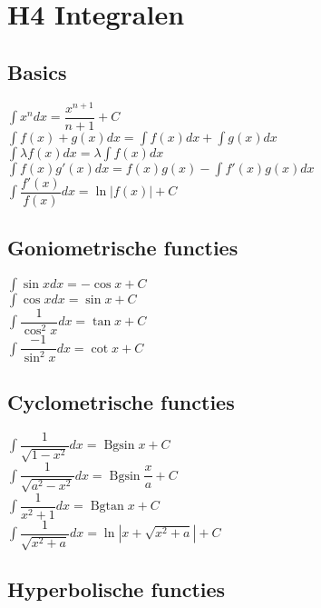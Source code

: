 \section{H4 Integralen}

\subsection{Basics}

$\displaystyle\int x^n dx = \dfrac{x^{n+1}}{n+1}+C$\\
$\displaystyle\int f(x)+g(x)dx = \displaystyle\int f(x)dx + \displaystyle\int g(x)dx$\\
$\displaystyle\int \lambda f(x)dx = \lambda \displaystyle\int f(x)dx$\\
$\displaystyle\int f(x)g'(x)dx = f(x)g(x)-\displaystyle\int f'(x)g(x)dx$\\
$\displaystyle\int \dfrac{f'(x)}{f(x)}dx = \ln |f(x)| + C$\\

\subsection{Goniometrische functies}

$\displaystyle\int \sin x dx = -\cos x + C$\\
$\displaystyle\int \cos x dx = \sin x + C$\\
$\displaystyle\int \dfrac{1}{\cos^2 x}dx = \tan x + C$\\
$\displaystyle\int \dfrac{-1}{\sin^2 x}dx = \cot x + C$\\

\subsection{Cyclometrische functies}

$\displaystyle\int \dfrac{1}{\sqrt{1-x^2}}dx = \operatorname{Bgsin} x + C$\\
$\displaystyle\int \dfrac{1}{\sqrt{a^2-x^2}}dx = \operatorname{Bgsin} \dfrac{x}{a} + C$\\
$\displaystyle\int \dfrac{1}{x^2+1}dx = \operatorname{Bgtan} x + C$\\
$\displaystyle\int \dfrac{1}{\sqrt{x^2+a}}dx = \ln |x+\sqrt{x^2+a}| + C$\\

\subsection{Hyperbolische functies}

